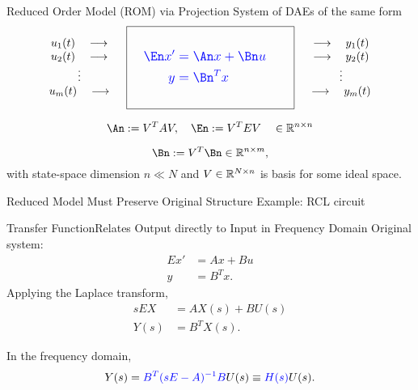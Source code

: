 \documentclass[serif]{beamer}
\newcommand{\Balert}[1]{\textcolor{blue}{#1}}
\begin{document}
\begin{frame}{Reduced Order Model (ROM) via Projection}
   System of DAEs of the same form
   \begin{equation*}  
   \begin{array}{c}
   u_1(t)\quad\longrightarrow \\ u_2(t)\quad\longrightarrow\\ \vdots\\u_\nin(t)\quad\longrightarrow
   \end{array}
  \quad
  \boxed{\large\Balert{%
 	    \begin{aligned}
 	    \\
 			\quad \En x' &=  \An x + \Bn u\quad\\
 			y &= \Bn^Tx\\
 			\\
 		\end{aligned}	
      }
  	}
  \quad	
		 \begin{array}{c}
	 \longrightarrow\quad y_1(t)\\ \longrightarrow\quad y_2(t)\\ \vdots\\\longrightarrow\quad y_\nin(t)
   \end{array} 
 \end{equation*}
 
 \[
 	\An := V^TAV, \quad \En := V^TEV \quad\in \R^{n\times n}
 \]
 
 \[
 	\Bn := V^T\Bn \in\R^{n\times \nin},
 \]
with state-space dimension $n \ll N$ and $V\in\mathbb{R}^{N\times n}$ is
basis for some ideal space.  
 
\end{frame}



\begin{frame}{Reduced Model Must Preserve Original Structure}
Example: RCL circuit
\begin{figure}
 	    \centering
\end{figure}
\end{frame}



\begin{frame}{Transfer Function}{Relates Output directly to Input in Frequency Domain}
Original system:
  \begin{align*}
   	E x' &=  Ax + Bu\\
   	 y &= B^Tx.
 \end{align*}
 Applying the Laplace transform,
  \begin{align*}
      sEX &=  AX(s) + BU(s)\\
      Y(s) &= B^TX(s).
 \end{align*}

In the frequency domain,
\[
Y(s) = \Balert{B^T(sE-A)^{-1}B} U(s) \equiv \Balert{H(s)}U(s).
\]
\end{frame}
\end{document}
